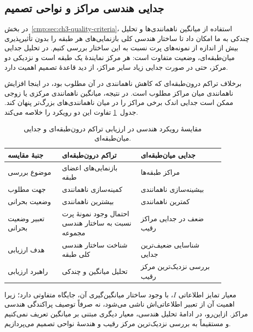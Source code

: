 \subsection{جدایی هندسی مراکز و نواحی تصمیم}
\label{cmp:subsec:ch3-geometric-separation}

در بخش~\ref{cmp:sec:ch3-quality-criteria}، استفاده از
میانگین ناهمانندی‌ها و تحلیل چندکی به ما امکان داد
تا ساختار هندسی کلی بازنمایی‌های هر طبقه را بدون
تأثیرپذیری بیش از اندازه از نمونه‌های پرت نسبت به
این ساختار بررسی کنیم. در تحلیل جدایی میان‌طبقه‌ای،
وضعیت متفاوت است: هر مرکز نمایندهٔ یک طبقه است
و نزدیکی دو مرکز، حتی در صورت جدایی زیاد سایر
مراکز، از دید قاعدهٔ تصمیم اهمیت دارد.

برخلاف تراکم درون‌طبقه‌ای که کاهش ناهمانندی
در آن مطلوب بود، در اینجا افزایش ناهمانندی میان
مراکز مطلوب است. در نتیجه، میانگین ناهمانندی
مرکزی یا زوجی ممکن است جدایی اندک برخی مراکز را
در میان ناهمانندی‌های بزرگ‌تر پنهان کند.
جدول~\ref{cmp:tab:ch3-compactness-separation-comparison}
تفاوت این دو رویکرد را خلاصه می‌کند.

\begin{table}[!htbp]
\centering
\caption{مقایسهٔ رویکرد هندسی در ارزیابی تراکم درون‌طبقه‌ای و جدایی میان‌طبقه‌ای.}
\label{cmp:tab:ch3-compactness-separation-comparison}
\begin{tabular}{p{0.22\linewidth}p{0.32\linewidth}p{0.34\linewidth}}
\hline
جنبهٔ مقایسه & تراکم درون‌طبقه‌ای & جدایی میان‌طبقه‌ای\\
\hline
موضوع بررسی & بازنمایی‌های اعضای طبقه & مراکز طبقه‌ها\\
جهت مطلوب & کمینه‌سازی ناهمانندی & بیشینه‌سازی ناهمانندی\\
وضعیت بحرانی & بیشترین ناهمانندی & کمترین ناهمانندی\\
تعبیر وضعیت بحرانی & احتمال وجود نمونهٔ پرت نسبت به ساختار هندسی مجموعه & ضعف در جدایی مراکز رقیب\\
هدف ارزیابی & شناخت ساختار هندسی کلی طبقه & شناسایی ضعیف‌ترین جدایی\\
راهبرد ارزیابی & تحلیل میانگین و چندکی & بررسی نزدیک‌ترین مرکز رقیب\\
\hline
\end{tabular}
\end{table}

معیار تمایز اطلاعاتی $I$، با وجود ساختار
میانگین‌گیری آن، جایگاه متفاوتی دارد؛ زیرا
اهمیت آن از تعبیر اطلاعاتی‌اش ناشی می‌شود، نه
صرفاً توصیف پراکندگی هندسی مراکز. ازاین‌رو،
در ادامهٔ تحلیل هندسی، معیار دیگری مبتنی بر
میانگین تعریف نمی‌کنیم و مستقیماً به بررسی
نزدیک‌ترین مرکز رقیب و هندسهٔ نواحی تصمیم
می‌پردازیم.

